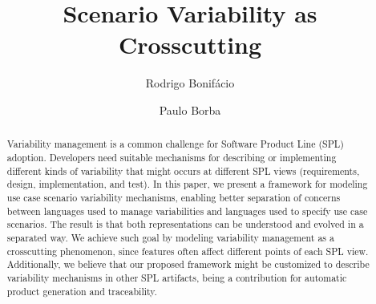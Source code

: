%
\usepackage{makeidx}  %
\usepackage{graphicx}
\usepackage{listings}
\usepackage{epsfig}
\usepackage[all]{xy}
%

\lstset{language=Haskell, numbers=left,
numberstyle=\tiny,numbersep=5pt,basicstyle=\scriptsize,aboveskip=20pt}
%
\frontmatter          %
%
\pagestyle{headings}  %

\mainmatter              %

\title{Scenario Variability as Crosscutting}
%
%
\author{Rodrigo Bonif\'{a}cio \and Paulo Borba}
%
%
%

\maketitle              %

\begin{abstract}
Variability management is a common challenge for Software Product
Line (SPL) adoption. Developers need suitable
mechanisms for describing or implementing different kinds of variability
that might occurs at different SPL views (requirements, design,
implementation, and test). In this paper, we present a framework for
modeling use case scenario variability mechanisms, enabling better
separation of concerns between languages used to manage
variabilities and languages used to specify use case scenarios. The
result is that both representations can be understood and evolved in
a separated way. We achieve such goal by modeling variability management
as a crosscutting phenomenon, since features often affect
different points of each SPL view. Additionally, we believe that our proposed framework might be customized to 
describe variability mechanisms in other SPL artifacts, being a contribution for automatic product generation and traceability.
\end{abstract}
%
